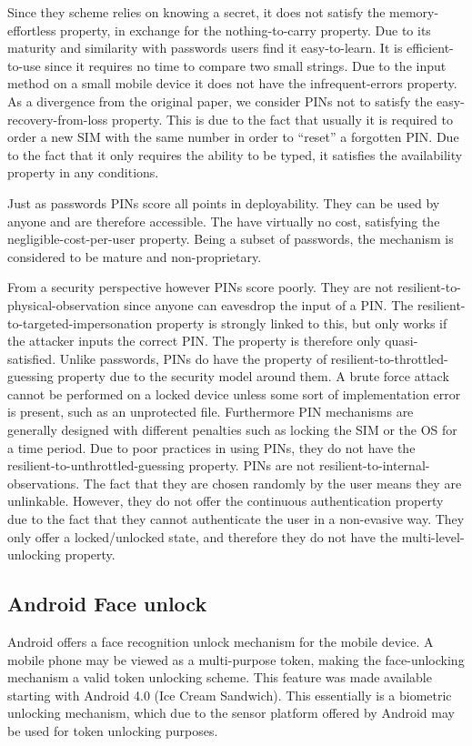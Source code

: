 	Since they scheme relies on knowing a secret, it does not satisfy the memory-effortless property, in exchange for the nothing-to-carry property. Due to its maturity and similarity with passwords users find it easy-to-learn. It is efficient-to-use since it requires no time to compare two small strings. Due to the input method on a small mobile device it does not have the infrequent-errors property. As a divergence from the original paper, we consider PINs not to satisfy the easy-recovery-from-loss property. This is due to the fact that usually it is required to order a new SIM with the same number in order to ``reset'' a forgotten PIN. Due to the fact that it only requires the ability to be typed, it satisfies the availability property in any conditions.
	
	Just as passwords PINs score all points in deployability. They can be used by anyone and are therefore accessible. The have virtually no cost, satisfying the negligible-cost-per-user property. Being a subset of passwords, the mechanism is considered to be mature and non-proprietary.
	
	From a security perspective however PINs score poorly. They are not resilient-to-physical-observation since anyone can eavesdrop the input of a PIN. The resilient-to-targeted-impersonation property is strongly linked to this, but only works if the attacker inputs the correct PIN. The property is therefore only quasi-satisfied.	Unlike passwords, PINs do have the property of resilient-to-throttled-guessing property due to the security model around them. A brute force attack cannot be performed on a locked device unless some sort of implementation error is present, such as an unprotected file. Furthermore PIN mechanisms are generally designed with different penalties such as locking the SIM or the OS for a time period. Due to poor practices in using PINs, they do not have the resilient-to-unthrottled-guessing property. PINs are not resilient-to-internal-observations. The fact that they are chosen randomly by the user means they are unlinkable. However, they do not offer the continuous authentication property due to the fact that they cannot authenticate the user in a non-evasive way. They only offer a locked/unlocked state, and therefore they do not have the multi-level-unlocking property. 
	
	\subsection{Android Face unlock}
	Android offers a face recognition unlock mechanism for the mobile device. A mobile phone may be viewed as a multi-purpose token, making the face-unlocking mechanism a valid token unlocking scheme. This feature was made available starting with Android 4.0 (Ice Cream Sandwich). This essentially is a biometric unlocking mechanism, which due to the sensor platform offered by Android may be used for token unlocking purposes.
	
